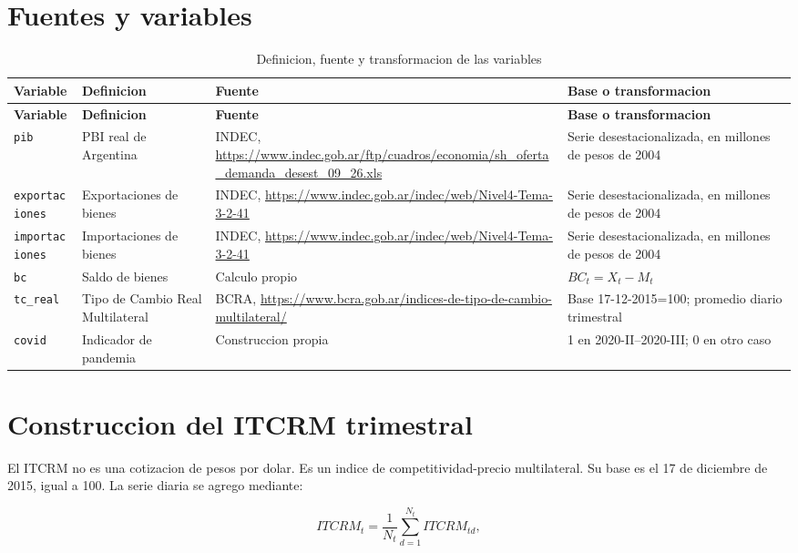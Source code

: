\documentclass[12pt,a4paper]{article}
\begin{document}
\section{Fuentes y variables}

\small
\begin{longtable}{p{}p{}p{}p{}}
\caption{Definicion, fuente y transformacion de las variables}\\
\toprule
\textbf{Variable} & \textbf{Definicion} & \textbf{Fuente} & \textbf{Base o transformacion}\\
\midrule
\endfirsthead
\toprule
\textbf{Variable} & \textbf{Definicion} & \textbf{Fuente} & \textbf{Base o transformacion}\\
\midrule
\endhead
\texttt{pib} & PBI real de Argentina & INDEC, \url{https://www.indec.gob.ar/ftp/cuadros/economia/sh_oferta_demanda_desest_09_26.xls} & Serie desestacionalizada, en millones de pesos de 2004\\
\texttt{exportaciones} & Exportaciones de bienes & INDEC, \url{https://www.indec.gob.ar/indec/web/Nivel4-Tema-3-2-41} & Serie desestacionalizada, en millones de pesos de 2004\\
\texttt{importaciones} & Importaciones de bienes & INDEC, \url{https://www.indec.gob.ar/indec/web/Nivel4-Tema-3-2-41} & Serie desestacionalizada, en millones de pesos de 2004\\
\texttt{bc} & Saldo de bienes & Calculo propio & $BC_t=X_t-M_t$\\
\texttt{tc\_real} & Tipo de Cambio Real Multilateral & BCRA, \url{https://www.bcra.gob.ar/indices-de-tipo-de-cambio-multilateral/} & Base 17-12-2015=100; promedio diario trimestral\\
\texttt{covid} & Indicador de pandemia & Construccion propia & 1 en 2020-II--2020-III; 0 en otro caso\\
\bottomrule
\end{longtable}
\normalsize

\section{Construccion del ITCRM trimestral}

El ITCRM no es una cotizacion de pesos por dolar. Es un indice de
competitividad-precio multilateral. Su base es el 17 de diciembre de 2015,
igual a 100. La serie diaria se agrego mediante:

\[
ITCRM_t=\frac{1}{N_t}\sum_{d=1}^{N_t}ITCRM_{td},
\]
\end{document}

